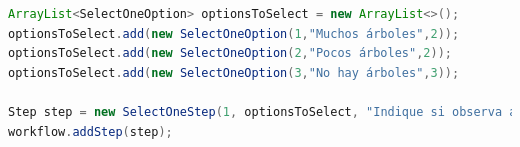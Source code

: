 \begin{lstlisting}[language=Java, frame=tlbr, caption=SelectOneStep en Java.]	
ArrayList<SelectOneOption> optionsToSelect = new ArrayList<>();
optionsToSelect.add(new SelectOneOption(1,"Muchos árboles",2));
optionsToSelect.add(new SelectOneOption(2,"Pocos árboles",2));
optionsToSelect.add(new SelectOneOption(3,"No hay árboles",3));

Step step = new SelectOneStep(1, optionsToSelect, "Indique si observa árboles");
workflow.addStep(step);
\end{lstlisting}


